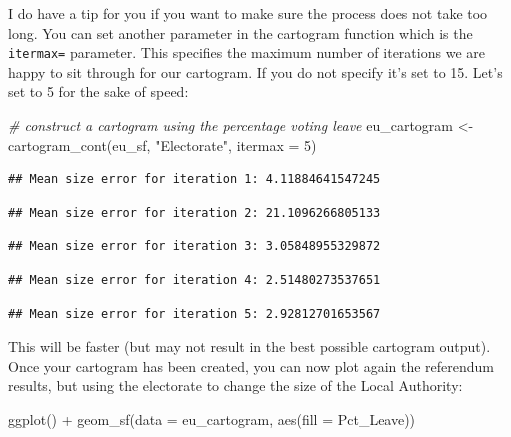 \documentclass[
]{book}
\newenvironment{Shaded}{\begin{snugshade}}{\end{snugshade}}
\newcommand{\AttributeTok}[1]{\textcolor[rgb]{0.77,0.63,0.00}{#1}}
\newcommand{\CommentTok}[1]{\textcolor[rgb]{0.56,0.35,0.01}{\textit{#1}}}
\newcommand{\DecValTok}[1]{\textcolor[rgb]{0.00,0.00,0.81}{#1}}
\newcommand{\FunctionTok}[1]{\textcolor[rgb]{0.00,0.00,0.00}{#1}}
\newcommand{\NormalTok}[1]{#1}
\newcommand{\OtherTok}[1]{\textcolor[rgb]{0.56,0.35,0.01}{#1}}
\newcommand{\SpecialCharTok}[1]{\textcolor[rgb]{0.00,0.00,0.00}{#1}}
\newcommand{\StringTok}[1]{\textcolor[rgb]{0.31,0.60,0.02}{#1}}
\begin{document}
I do have a tip for you if you want to make sure the process does not take too long. You can set another parameter in the cartogram function which is the \texttt{itermax=} parameter. This specifies the maximum number of iterations we are happy to sit through for our cartogram. If you do not specify it's set to 15. Let's set to 5 for the sake of speed:

\begin{Shaded}
\begin{Highlighting}[]
\CommentTok{\# construct a cartogram using the percentage voting leave}
\NormalTok{eu\_cartogram }\OtherTok{\textless{}{-}} \FunctionTok{cartogram\_cont}\NormalTok{(eu\_sf, }\StringTok{"Electorate"}\NormalTok{, }\AttributeTok{itermax =} \DecValTok{5}\NormalTok{)}
\end{Highlighting}
\end{Shaded}

\begin{verbatim}
## Mean size error for iteration 1: 4.11884641547245
\end{verbatim}

\begin{verbatim}
## Mean size error for iteration 2: 21.1096266805133
\end{verbatim}

\begin{verbatim}
## Mean size error for iteration 3: 3.05848955329872
\end{verbatim}

\begin{verbatim}
## Mean size error for iteration 4: 2.51480273537651
\end{verbatim}

\begin{verbatim}
## Mean size error for iteration 5: 2.92812701653567
\end{verbatim}

This will be faster (but may not result in the best possible cartogram output). Once your cartogram has been created, you can now plot again the referendum results, but using the electorate to change the size of the Local Authority:

\begin{Shaded}
\begin{Highlighting}[]
\FunctionTok{ggplot}\NormalTok{() }\SpecialCharTok{+}
  \FunctionTok{geom\_sf}\NormalTok{(}\AttributeTok{data =}\NormalTok{ eu\_cartogram, }\FunctionTok{aes}\NormalTok{(}\AttributeTok{fill =}\NormalTok{ Pct\_Leave)) }
\end{Highlighting}
\end{Shaded}
\end{document}
